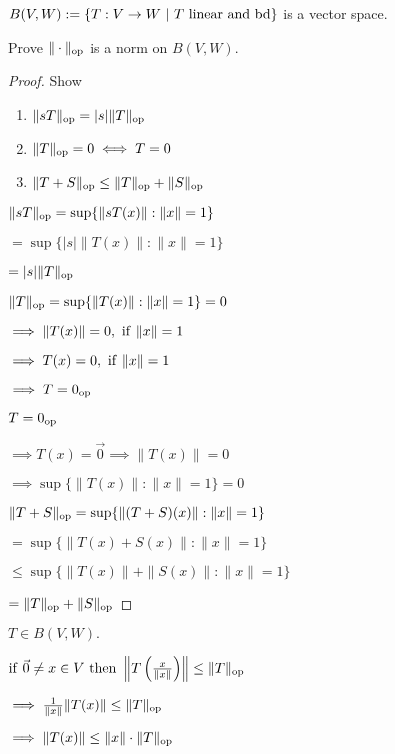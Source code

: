 \documentclass[12pt]{article}
\begin{document}
\bboxprop
\begin{prop}
    \(B(V,W):=\{T:V\to W\ |\ T\ \TR{linear\ and\ bd}\}\) is a vector space.

    Prove \(\|\cdot\|_{\mathrm{op}}\) is a norm on \(B(V,W)\).
\end{prop}
\ebox

\bboxproof
\begin{proof}
    Show
    \begin{enumerate}
        \item \(\|sT\|_{\mathrm{op}} = |s|\|T\|_{\mathrm{op}}\)
        \item \(\|T\|_{\mathrm{op}}=0\iff T=0\)
        \item \(\|T+S\|_{\mathrm{op}}\le\|T\|_{\mathrm{op}}+\|S\|_{\mathrm{op}}\)
    \end{enumerate}

     \(\|sT\|_{\mathrm{op}}=\sup\{\|sT(x)\|:\|x\|=1\}\)

    \(=\sup\{|s|\|T(x)\|:\|x\|=1\}\)

    \(=|s|\|T\|_{\mathrm{op}}\)

    \(\|T\|_{\mathrm{op}}=\sup\{\|T(x)\|:\|x\|=1\}=0\)

    \(\implies \|T(x)\|=0,\ \iif\ \|x\|=1\)

    \(\implies T(x)=0,\ \iif\ \|x\|=1\)

    \(\implies T=0_{\mathrm{op}}\)

    \(T=0_{\mathrm{op}}\)

    \(\implies T(x)=\vec 0\implies \|T(x)\|=0\)

    \(\implies \sup\{\|T(x)\|:\|x\|=1\} = 0\)

    \(\|T+S\|_{\mathrm{op}}=
    \sup\{\|(T+S)(x)\|:\|x\|=1\}\)

    \(=\sup\{\|T(x) + S(x)\|:\|x\|=1\}\)

    \(\le\sup\{\|T(x)\|+\|S(x)\|:\|x\|=1\}\)
    
    \(=\|T\|_{\mathrm{op}}+\|S\|_{\mathrm{op}}\)
\end{proof}
\ebox

\bboxnote
\begin{note}
    \(T\in B(V,W).\)

    \(\iif\ \vec 0\neq x\in V\ \tthen\ 
    \left\|T\left(\frac x{\|x\|}\right)\right\|\le\|T\|_\TR{op}\)

    \(\implies \frac1{\|x\|}\|T(x)\|\le\|T\|_{\mathrm{op}}\)

    \(\implies\|T(x)\|\le\|x\|\cdot\|T\|_{\mathrm{op}}\)
\end{note}
\ebox
\end{document}
